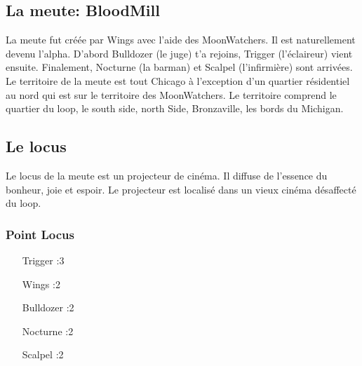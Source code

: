 \documentclass[oneside,12pt]{book}
\begin{document}
\begin{flushleft}
\chapter{La meute: BloodMill}
La meute fut créée par Wings avec l'aide des MoonWatchers. Il est naturellement devenu l'alpha.
D’abord Bulldozer (le juge) t’a rejoins, Trigger (l’éclaireur) vient ensuite. 
Finalement, Nocturne (la barman) et Scalpel (l’infirmière) sont arrivées.
Le territoire de la meute est tout Chicago à l'exception d'un quartier résidentiel au nord qui est sur le territoire des MoonWatchers. 
Le territoire comprend le quartier du loop, le south side, north Side, Bronzaville, les bords du Michigan.
\section{Le locus}
Le locus de la meute est un projecteur de cinéma. Il diffuse de l'essence du bonheur, joie et espoir. 
Le projecteur est localisé dans un vieux cinéma désaffecté du loop.
\subsection{Point Locus}
\begin{itemize}
\item[Trigger]:3
\item[Wings]:2
\item[Bulldozer]:2
\item[Nocturne]:2
\item[Scalpel]:2
\end{itemize}

\end{flushleft}
\end{document}
